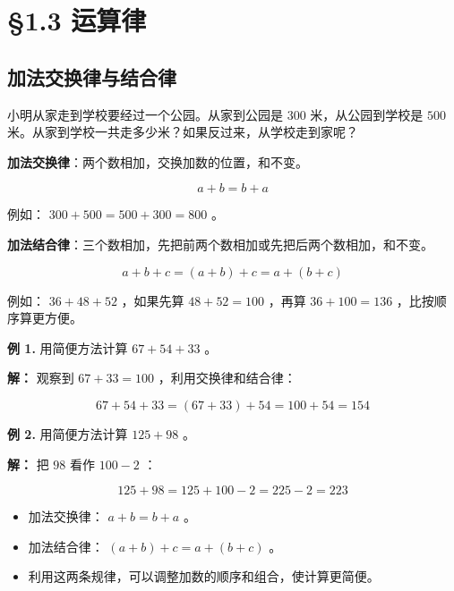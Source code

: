 \chapter{§1.3 运算律}
\label{sec:1.3}





\section*{加法交换律与结合律}


\begin{explore}


小明从家走到学校要经过一个公园。从家到公园是 $300$ 米，从公园到学校是 $500$ 米。从家到学校一共走多少米？如果反过来，从学校走到家呢？

\end{explore}

\begin{understand}


\textbf{加法交换律}：两个数相加，交换加数的位置，和不变。

\[
a + b = b + a
\]


例如： $300 + 500 = 500 + 300 = 800$ 。

\textbf{加法结合律}：三个数相加，先把前两个数相加或先把后两个数相加，和不变。

\[
a + b + c = (a + b) + c = a + (b + c)
\]


例如： $36 + 48 + 52$ ，如果先算 $48 + 52 = 100$ ，再算 $36 + 100 = 136$ ，比按顺序算更方便。

\end{understand}

\begin{workedexamples}


\textbf{例 1.} 用简便方法计算 $67 + 54 + 33$ 。

\textbf{解：} 观察到 $67 + 33 = 100$ ，利用交换律和结合律：

\[
67 + 54 + 33 = (67 + 33) + 54 = 100 + 54 = 154
\]


\textbf{例 2.} 用简便方法计算 $125 + 98$ 。

\textbf{解：} 把 $98$ 看作 $100 - 2$ ：

\[
125 + 98 = 125 + 100 - 2 = 225 - 2 = 223
\]


\end{workedexamples}

\begin{keytakeaway}


\begin{itemize}
  \item 加法交换律： $a + b = b + a$ 。
  \item 加法结合律： $(a + b) + c = a + (b + c)$ 。
  \item 利用这两条规律，可以调整加数的顺序和组合，使计算更简便。
\end{itemize}


\end{keytakeaway}

